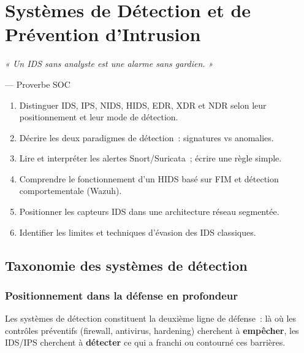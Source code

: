 \chapter{Systèmes de Détection et de Prévention d'Intrusion}
\label{chap:ids}

\epigraph{\itshape « Un IDS sans analyste est une alarme sans gardien. »}
         {--- Proverbe SOC}

\begin{boxobjectifs}
\begin{enumerate}
  \item Distinguer IDS, IPS, NIDS, HIDS, EDR, XDR et NDR selon leur positionnement
        et leur mode de détection.
  \item Décrire les deux paradigmes de détection~: signatures vs anomalies.
  \item Lire et interpréter les alertes Snort/Suricata~; écrire une règle simple.
  \item Comprendre le fonctionnement d'un HIDS basé sur FIM et détection
        comportementale (Wazuh).
  \item Positionner les capteurs IDS dans une architecture réseau segmentée.
  \item Identifier les limites et techniques d'évasion des IDS classiques.
\end{enumerate}
\end{boxobjectifs}

\section{Taxonomie des systèmes de détection}
\label{sec:ids-taxo}

\subsection{Positionnement dans la défense en profondeur}

Les systèmes de détection constituent la deuxième ligne de défense~: là
où les contrôles préventifs (firewall, antivirus, hardening) cherchent à
\textbf{empêcher}, les IDS/IPS cherchent à \textbf{détecter} ce qui a
franchi ou contourné ces barrières.

